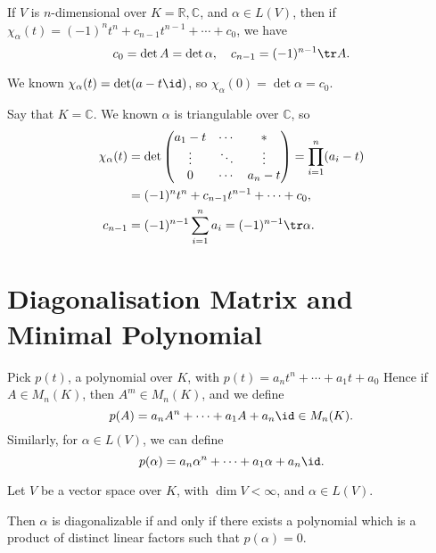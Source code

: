 \documentclass[12pt]{article}
\begin{document}
\begin{lemma}
	If $V$ is $n$-dimensional over $K = \mathbb{R}, \mathbb{C}$, and $\alpha \in L(V)$, then if $\chi_{\alpha}(t) = (-1)^{n}t^{n} + c_{n-1}t^{n-1} + \cdots + c_0$, we have
	\[
		c_0 = \det A = \det \alpha, \quad c_{n-1} = (-1)^{n-1} \tr A
	.\]
\end{lemma}

\begin{proofbox}
	We known $\chi_{\alpha}(t) = \det(a - t \id)$, so $\chi_{\alpha}(0) = \det \alpha = c_0$.

	Say that $K = \mathbb{C}$. We known $\alpha$ is triangulable over $\mathbb{C}$, so
	\begin{align*}
		\chi_{\alpha}(t) &= \det
		\begin{pmatrix}
			a_1 - t & \cdots & \ast \\
			\vdots & \ddots & \vdots \\
			0 & \cdots & a_n - t
		\end{pmatrix} = \prod_{i = 1}^{n}(a_i - t) \\
				 &= (-1)^{n}t^{n} + c_{n-1}t^{n-1} + \cdots + c_0, \\
		c_{n-1} &= (-1)^{n-1} \sum_{i = 1}^{n} a_i = (-1)^{n-1} \tr \alpha.
	\end{align*}
\end{proofbox}

\newpage

\section{Diagonalisation Matrix and Minimal Polynomial}%
\label{sec:diagonalisation_matrix_and_minimal_polynomial}

\begin{definition}
	Pick $p(t)$, a polynomial over $K$, with $p(t) = a_n t^{n} + \cdots + a_1 t + a_0$ Hence if $A \in M_n(K)$, then $A^{m} \in M_n(K)$, and we define
	\[
		p(A) = a_n A^{n} + \cdots + a_1 A + a_n \id \in M_n(K)
	.\]
	Similarly, for $\alpha \in L(V)$, we can define
	\[
		p(\alpha) = a_n \alpha^{n} + \cdots + a_1 \alpha + a_n \id
	.\]
\end{definition}

\begin{theorem}
	Let $V$ be a vector space over $K$, with $\dim V < \infty$, and $\alpha \in L(V)$.

	Then $\alpha$ is diagonalizable if and only if there exists a polynomial which is a product of distinct linear factors such that $p(\alpha) = 0$.
\end{theorem}
\end{document}
